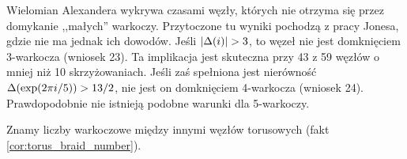 Wielomian Alexandera wykrywa czasami węzły, których nie otrzyma się przez domykanie ,,małych'' warkoczy.
%
Przytoczone tu wyniki pochodzą z pracy \cite{jones85} Jonesa, gdzie nie ma jednak ich dowodów.
Jeśli $|\Delta(i)| > 3$, to węzeł nie jest domknięciem 3-warkocza (wniosek 23).
Ta implikacja jest skuteczna przy 43 z 59 węzłów o mniej niż 10 skrzyżowaniach.
Jeśli zaś spełniona jest nierówność $\Delta (\exp (2\pi i / 5)) > 13/2$, nie jest on domknięciem 4-warkocza (wniosek 24).
Prawdopodobnie nie istnieją podobne warunki dla 5-warkoczy.

Znamy liczby warkoczowe między innymi węzłów torusowych (fakt \ref{cor:torus_braid_number}).



